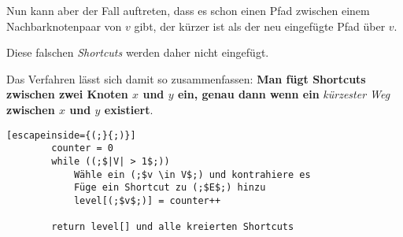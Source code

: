 \documentclass{scrartcl}%
\begin{document}
    Nun kann aber der Fall auftreten, dass es schon einen Pfad zwischen einem Nachbarknotenpaar von $v$ gibt, der kürzer ist als der neu eingefügte Pfad über $v$.

    \begin{figure}[htb]
        \centering
    \end{figure}

    Diese falschen \textit{Shortcuts} werden daher nicht eingefügt.

    \vspace*{0.3cm}
    Das Verfahren lässt sich damit so zusammenfassen: \textbf{\textsf{Man fügt Shortcuts zwischen zwei Knoten $x$ und $y$ ein, genau dann wenn ein}} \textit{kürzester Weg} \textbf{\textsf{zwischen $x$ und $y$ existiert}}.

    \newpage
    \begin{lstlisting}[escapeinside={(;}{;)}]
        counter = 0
        while ((;$|V| > 1$;))
            Wähle ein (;$v \in V$;) und kontrahiere es
            Füge ein Shortcut zu (;$E$;) hinzu
            level[(;$v$;)] = counter++

        return level[] und alle kreierten Shortcuts
    \end{lstlisting}
\end{document}
